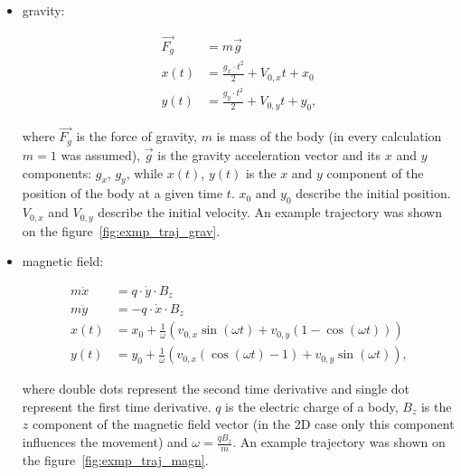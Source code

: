 \documentclass[12pt,letterpaper]{article}
\newcommand{\nid}{\noindent}
\begin{document}
\begin{itemize}
    \item gravity:
    \begin{flushleft}
        \begin{align*}
            \vec{F_g} & = m\vec{g}\\
            x(t) & = \frac{g_x\cdot t^2}{2} + V_{0,x} t + x_0\\
            y(t) & = \frac{g_y\cdot t^2}{2} + V_{0,y} t + y_0,
        \end{align*}
    \end{flushleft}
    \nid where $\vec{F_g}$ is the force of gravity, $m$ is mass of the body (in every calculation $m=1$ was assumed), $\vec{g}$ is the gravity acceleration vector and its $x$ and $y$ components: $g_x$, $g_y$, while $x(t)$, $y(t)$ is the $x$ and $y$ component of the position of the body at a given time $t$. $x_0$ and $y_0$ describe the initial position. $V_{0,x}$ and $V_{0,y}$ describe the initial velocity. An example trajectory was shown on the figure~\ref{fig:exmp_traj_grav}.

    \item magnetic field:
    \begin{flushleft}
        \begin{align*}
            m \ddot{x} & = q \cdot \dot{y} \cdot B_z\\
            m \ddot{y} & = -q \cdot \dot{x} \cdot B_z\\
            x(t) & = x_0 + \frac{1}{\omega}(v_{0,x} \sin{(\omega t)} + v_{0,y} (1 - \cos{(\omega t)}))\\
            y(t) & = y_0 + \frac{1}{\omega}(v_{0,x} (\cos{(\omega t)} - 1) + v_{0,y} \sin{(\omega t)}),
        \end{align*}
    \end{flushleft}
    \nid where double dots represent the second time derivative and single dot represent the first time derivative. $q$ is the electric charge of a body, $B_z$ is the $z$ component of the magnetic field vector (in the 2D case only this component influences the movement) and $\omega=\frac{qB_z}{m}$. An example trajectory was shown on the figure~\ref{fig:exmp_traj_magn}.


\end{itemize}
\end{document}

